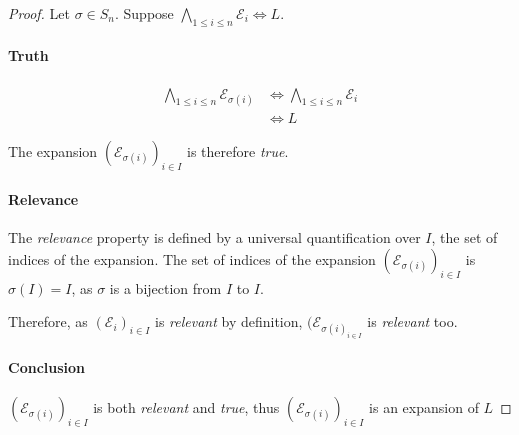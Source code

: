 \documentclass{article}
\theoremstyle{definition}
\begin{document}
\begin{proof}
	Let $\sigma\in S_n$.
	Suppose $\bigwedge_{1\le i\le n} \mathcal{E}_i \iff L$.
	\paragraph{Truth}

	\begin{align*}
		\bigwedge_{1\le i\le n} \mathcal{E}_{\sigma(i)} &\iff \bigwedge_{1\le i\le n} \mathcal{E}_i  \tag{by commutativity of $\land$} \\
								&\iff L \tag{by definition}
	\end{align*}

	The expansion $(\mathcal{E}_{\sigma(i)})_{i\in I}$ is therefore \emph{true}.

	\paragraph{Relevance}
	The \emph{relevance} property is defined by a universal quantification over $I$, the set of indices of the expansion.
	The set of indices of the expansion $(\mathcal{E}_{\sigma(i)})_{i\in I}$ is $\sigma(I) = I$, as $\sigma$ is a bijection from $I$ to $I$.

	Therefore, as  $(\mathcal{E}_i)_{i\in I}$ is \emph{relevant} by definition, $(\mathcal{E}_{\sigma(i)}_{i\in I}$ is \emph{relevant} too.

	\paragraph{Conclusion}
	$(\mathcal{E}_{\sigma(i)})_{i\in I}$ is both \emph{relevant}  and \emph{true}, thus $(\mathcal{E}_{\sigma(i)})_{i\in I}$ is an expansion of $L$
\end{proof}
\end{document}
